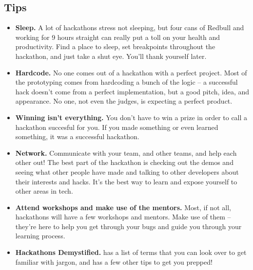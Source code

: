 \documentclass{article}
\begin{document}
\subsection{Tips}
\begin{itemize}
    \item \textbf{Sleep.} A lot of hackathons stress not sleeping, but four cans of Redbull and working for 9 hours straight can really put a toll on your health and productivity. Find a place to sleep, set breakpoints throughout the hackathon, and just take a shut eye. You'll thank yourself later.
    \item \textbf{Hardcode.} No one comes out of a hackathon with a perfect project. Most of the prototyping comes from hardcoding a bunch of the logic -- a successful hack doesn't come from a perfect implementation, but a good pitch, idea, and appearance. No one, not even the judges, is expecting a perfect product.
    \item \textbf{Winning isn't everything.} You don't have to win a prize in order to call a hackathon succesful for you. If you made something or even learned something, it was a successful hackathon.
    \item \textbf{Network.} Communicate with your team, and other teams, and help each other out! The best part of the hackathon is checking out the demos and seeing what other people have made and talking to other developers about their interests and hacks. It's the best way to learn and expose yourself to other areas in tech.
    \item \textbf{Attend workshops and make use of the mentors.} Most, if not all, hackathons will have a few workshops and mentors. Make use of them -- they're here to help you get through your bugs and guide you through your learning process.
    \item \textbf{Hackathons Demystified.}  has a list of terms that you can look over to get familiar with jargon, and has a few other tips to get you prepped! 
\end{itemize}
\end{document}
